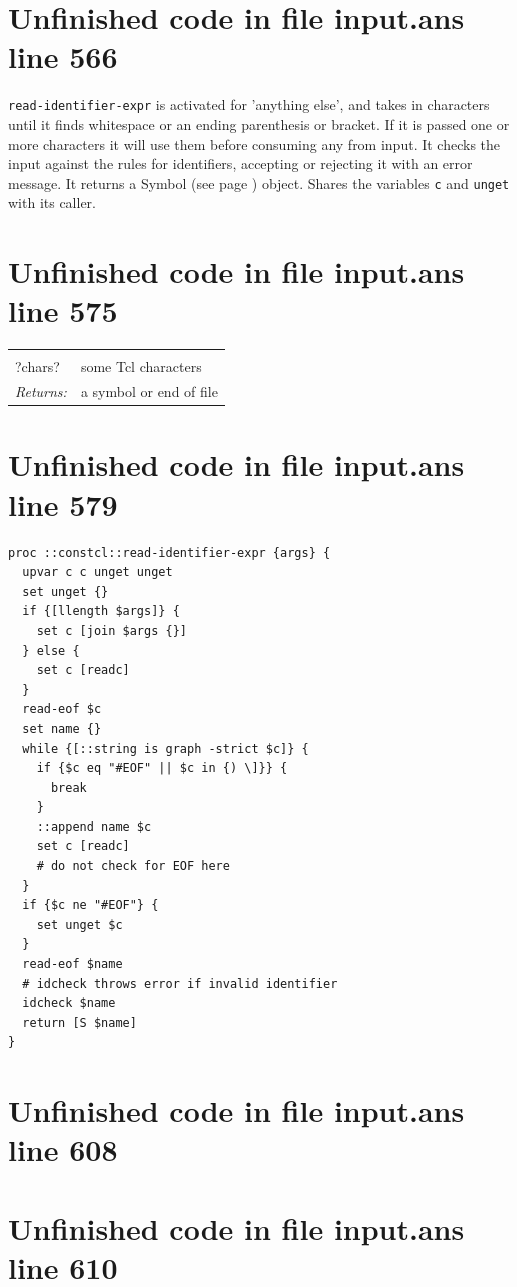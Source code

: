 \documentclass[twoside,9pt]{report}
\begin{document}
\section{Unfinished code in file input.ans line 566}


\texttt{read-identifier-expr} is activated for 'anything else', and takes in characters until it finds whitespace or an ending parenthesis or bracket. If it is passed one or more characters it will use them before consuming any from input. It checks the input against the rules for identifiers, accepting or rejecting it with an error message. It returns a Symbol (see page \pageref{symbols}) object. Shares the variables \texttt{c} and \texttt{unget} with its caller.

\section{Unfinished code in file input.ans line 575}
\noindent\begin{tabular}{ |p{1.9cm} p{8cm}| }
\hline
\rowcolor[HTML]{CCCCCC} \multicolumn{2}{|l|}{\bf read-identifier-expr (internal)} \\
?chars? & some Tcl characters \\
\textit{Returns:} & a symbol or end of file \\
\hline
\end{tabular}
\section{Unfinished code in file input.ans line 579}
\begin{lstlisting}
proc ::constcl::read-identifier-expr {args} {
  upvar c c unget unget
  set unget {}
  if {[llength $args]} {
    set c [join $args {}]
  } else {
    set c [readc]
  }
  read-eof $c
  set name {}
  while {[::string is graph -strict $c]} {
    if {$c eq "#EOF" || $c in {) \]}} {
      break
    }
    ::append name $c
    set c [readc]
    # do not check for EOF here
  }
  if {$c ne "#EOF"} {
    set unget $c
  }
  read-eof $name
  # idcheck throws error if invalid identifier
  idcheck $name
  return [S $name]
}
\end{lstlisting}
\section{Unfinished code in file input.ans line 608}
\section{Unfinished code in file input.ans line 610}
\end{document}
